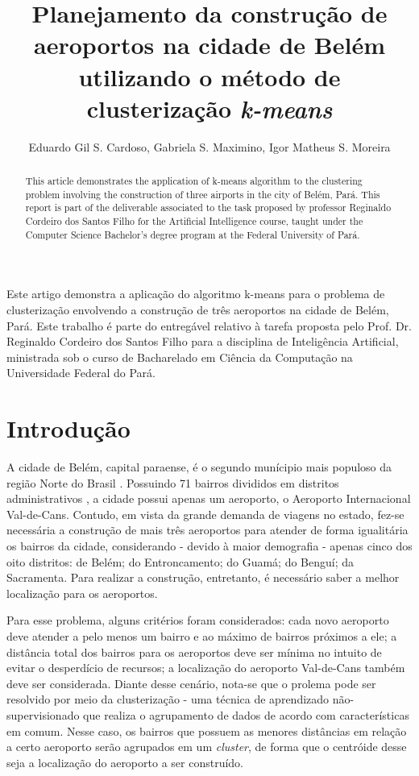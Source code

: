 \documentclass[12pt]{article}
\title{Planejamento da construção de aeroportos na cidade de Belém utilizando o método de clusterização \textit{k-means}}
\author{Eduardo Gil S. Cardoso\inst{1}, Gabriela S. Maximino\inst{1}, Igor Matheus S. Moreira\inst{1} }
\begin{document}
 

\maketitle

\begin{abstract}
  This article demonstrates the application of k-means algorithm to the clustering problem involving the construction of three airports in the city of Belém, Pará. This report is part of the deliverable associated to the task proposed by professor Reginaldo Cordeiro dos Santos Filho for the Artificial Intelligence course, taught under the Computer Science Bachelor's degree program at the Federal University of Pará.
\end{abstract}
     
\begin{resumo} 
  Este artigo demonstra a aplicação do algoritmo k-means para o problema de clusterização envolvendo a construção de três aeroportos na cidade de Belém, Pará. Este trabalho é parte do entregável relativo à tarefa proposta pelo Prof. Dr. Reginaldo Cordeiro dos Santos Filho para a disciplina de Inteligência Artificial, ministrada sob o curso de Bacharelado em Ciência da Computação na Universidade Federal do Pará.
\end{resumo}


\section{Introdução}
A cidade de Belém, capital paraense, é o segundo munícipio mais populoso da região Norte do Brasil \cite{ibge}. Possuindo 71 bairros divididos em distritos administrativos \cite{belemwiki}, a cidade possui apenas um aeroporto, o Aeroporto Internacional Val-de-Cans. Contudo, em vista da grande demanda de viagens no estado, fez-se necessária a construção de mais três aeroportos para atender de forma igualitária os bairros da cidade, considerando - devido à maior demografia - apenas cinco dos oito distritos: de Belém; do Entroncamento; do Guamá; do Benguí; da Sacramenta. Para realizar a construção, entretanto, é necessário saber a melhor localização para os aeroportos.

Para esse problema, alguns critérios foram considerados: cada novo aeroporto deve atender a pelo menos um bairro e ao máximo de bairros próximos a ele; a distância total dos bairros para os aeroportos deve ser mínima no intuito de evitar o desperdício de recursos; a localização do aeroporto Val-de-Cans também deve ser considerada. Diante desse cenário, nota-se que o prolema pode ser resolvido por meio da clusterização - uma técnica de aprendizado não-supervisionado que realiza o agrupamento de dados de acordo com características em comum. Nesse caso, os bairros que possuem as menores distâncias em relação a certo aeroporto serão agrupados em um \textit{cluster}, de forma que o centróide desse seja a localização do aeroporto a ser construído.
\end{document}
